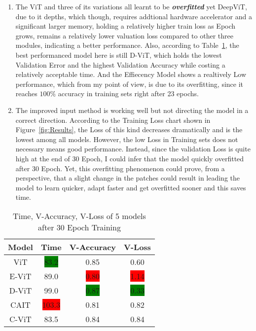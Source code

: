 \begin{enumerate}
  \item The ViT and three of its variations all learnt to be \textbf{\textit{overfitted}} yet DeepViT, due to it depths, which though, requires addtional hardware accelerator and a significant larger memory, holding a relatively higher train loss as Epoch grows, remains a relatively lower valuation loss compared to other three modules, indicating a better performance. Also, according to Table~\ref{tab:1}, the best performanced model here is still D-ViT, which holds the lowest Validation Error and the highest Validation Accuracy while costing a relatively acceptable time. And the Effiecency Model shows a realtively Low performance, which from my point of view, is due to its overfitting, since it reaches $100\%$ accuracy in training sets right after 23 epochs.
  \item The improved input method is working well but not directing the model in a correct direction. According to the Training Loss chart shown in Figure~\ref{fig:Results}, the Loss of this kind decreases dramatically and is the lowest among all models. However, the low Loss in Training sets does not necessary means good performance. Instead, since the validation Loss is quite high at the end of 30 Epoch, I could infer that the model quickly overfitted after 30 Epoch. Yet, this overfitting phenomenon could prove, from a perspective, that a slight change in the patches could result in leading the model to learn quicker, adapt faster and get overfitted sooner and this saves time.
\end{enumerate}


\begin{table}[ht]
\centering
\begin{tabular}{c | c c c} 
 \hline
 Model  & Time  & V-Accuracy & V-Loss \\ [0.5ex] 
 \hline
  ViT    & \colorbox{green}{83.2}  & 0.85 & 0.60 \\ 
  E-ViT  & 89.0  & \colorbox{red}{0.80} & \colorbox{red}{1.14} \\
  D-ViT  & 99.0  & \colorbox{green}{0.87} & \colorbox{green}{0.33} \\
  CAIT   & \colorbox{red}{103.3} & 0.81 & 0.82 \\
  C-ViT  & 83.5  & 0.84 & 0.84\\ [1ex] 
 \hline
\end{tabular}
\caption{Time, V-Accuracy, V-Loss of 5 models after 30 Epoch Training}
\label{tab:1}
\end{table}


